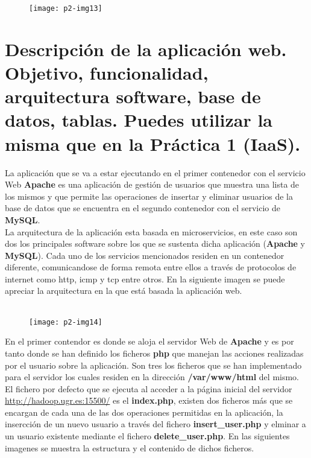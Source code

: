 \documentclass[10pt]{article}
\begin{document}
\begin{figure}[H]
	\begin{center}
 		\texttt{[image: p2-img13]}
	\end{center} 
\end{figure}


\section{Descripción de la aplicación web. Objetivo, funcionalidad, arquitectura software, base de datos, tablas. Puedes utilizar la misma que en la Práctica 1 (IaaS). }
La aplicación que se va a estar ejecutando en el primer contenedor con el servicio Web \textbf{Apache} es una aplicación de gestión de usuarios que muestra una lista de los mismos y que permite las operaciones de insertar y eliminar usuarios de la base de datos que se encuentra en el segundo contenedor con el servicio de \textbf{MySQL}.\\

La arquitectura de la aplicación esta basada en microservicios, en este caso son dos los principales software  sobre los que se sustenta dicha aplicación (\textbf{Apache} y \textbf{MySQL}). Cada uno de los servicios mencionados residen en un contenedor diferente, comunicandose de forma remota entre ellos a través de protocolos de internet como http, icmp y tcp entre otros. En la siguiente imagen se puede apreciar la arquitectura en la que está basada la aplicación web.\\ \\

 \begin{figure}[H]
	\begin{center}
 		\texttt{[image: p2-img14]}
	\end{center} 
\end{figure}

En el primer contendor es donde se aloja el servidor Web de \textbf{Apache} y es por tanto donde se han definido los ficheros \textbf{php} que manejan las acciones realizadas por el usuario sobre la aplicación. Son tres los ficheros que se han implementado para el servidor los cuales residen en la dirección \textbf{/var/www/html} del mismo. El fichero por defecto que se ejecuta al acceder a la página inicial del servidor \url{http://hadoop.ugr.es:15500/} es el \textbf{index.php}, existen dos ficheros más que se encargan de cada una de las dos operaciones permitidas en la aplicación, la insercción de un nuevo usuario a través del fichero \textbf{insert\_user.php} y elminar a un usuario existente mediante el fichero \textbf{delete\_user.php}. En las siguientes imagenes se muestra la estructura y el contenido de dichos ficheros.\\ 
\end{document}
